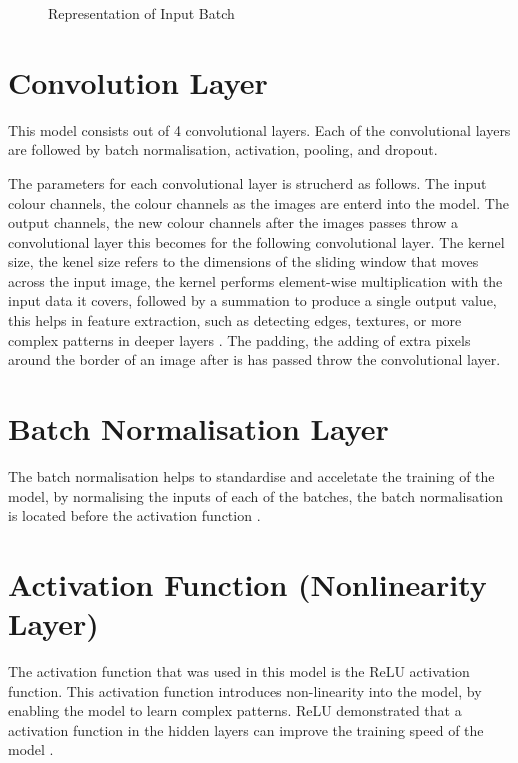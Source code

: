 \documentclass[a4paper,oneside,11pt]{book}
\begin{document}
\begin{figure}[h]
    \centering
    \caption{Representation of Input Batch}
\end{figure}

\section{Convolution Layer}

This model consists out of 4 convolutional layers. Each of the convolutional layers are followed by batch normalisation, activation, pooling, and dropout.

The parameters for each convolutional layer is strucherd as follows. The input colour channels, the colour channels as the images are enterd into the model. The output channels, the new colour channels after the images passes throw a convolutional layer this becomes for the following convolutional layer. The kernel size, the kenel size refers to the dimensions of the sliding window that moves across the input image, the kernel performs element-wise multiplication with the input data it covers, followed by a summation to produce a single output value, this helps in feature extraction, such as detecting edges, textures, or more complex patterns in deeper layers \citep{ding2022scaling}. The padding, the adding of extra pixels around the border of an image after is has passed throw the convolutional layer.

\section{Batch Normalisation Layer}

The batch normalisation helps to standardise and acceletate the training of the model, by normalising the inputs of each of the batches, the batch normalisation is located before the activation function \citep{kumar2021convolutional}.

\section{Activation Function (Nonlinearity Layer)}

The activation function that was used in this model is the ReLU activation function. This activation function introduces non-linearity into the model, by enabling the model to learn complex patterns. ReLU demonstrated that a activation function in the hidden layers can improve the training speed of the model \citep{ide2017improvement}.
\end{document}
